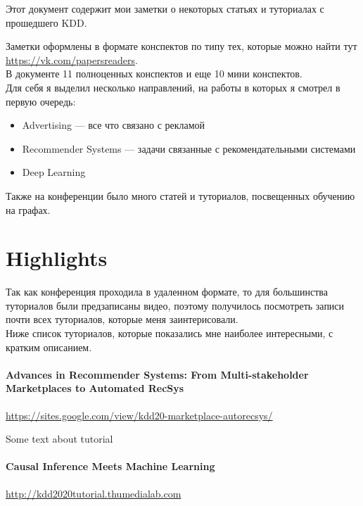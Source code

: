 Этот документ содержит мои заметки о некоторых статьях и туториалах с прошедшего KDD.

Заметки оформлены в формате конспектов по типу тех, которые можно найти тут \url{https://vk.com/papersreaders}. \\

В документе 11 полноценных конспектов и еще 10 мини конспектов. \\

Для себя я выделил несколько направлений, на работы в которых я смотрел в первую очередь:
\begin{itemize}
    \item Advertising --- все что связано с рекламой
    \item Recommender Systems --- задачи связанные с рекомендательными системами
    \item Deep Learning
\end{itemize}

Также на конференции было много статей и туториалов, посвещенных обучению на графах.

\section*{Highlights}

Так как конференция проходила в удаленном формате, то для большинства туториалов были предзаписаны видео, поэтому получилось посмотреть записи почти всех туториалов, которые меня заинтерисовали. \\

Ниже список туториалов, которые показались мне наиболее интересными, с кратким описанием.

\paragraph{Advances in Recommender Systems: From Multi-stakeholder Marketplaces to Automated RecSys} $ $\\

\url{https://sites.google.com/view/kdd20-marketplace-autorecsys/}

Some text about tutorial

\paragraph{Causal Inference Meets Machine Learning} $ $\\

\url{http://kdd2020tutorial.thumedialab.com}

